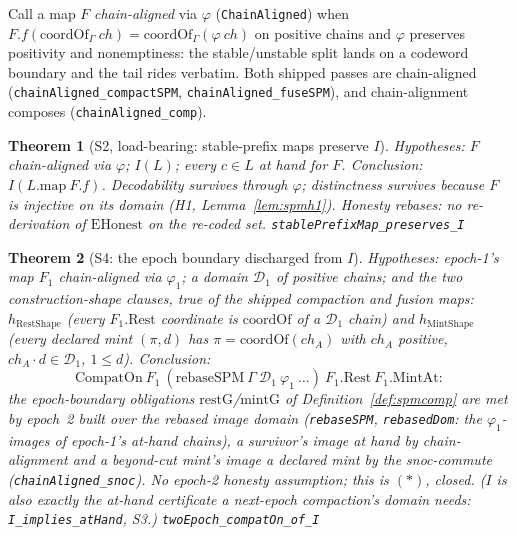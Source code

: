\documentclass[11pt]{article}
\newtheorem{theorem}{Theorem}[section]
\newcommand{\lean}[1]{\texttt{#1}}
\begin{document}
\noindent Call a map $F$ \emph{chain-aligned} via $\varphi$
(\lean{ChainAligned}) when $F.f(\mathrm{coordOf}_\Gamma\ \mathit{ch})
= \mathrm{coordOf}_\Gamma(\varphi\ \mathit{ch})$ on positive chains
and $\varphi$ preserves positivity and nonemptiness: the
stable/unstable split lands on a codeword boundary and the tail rides
verbatim. Both shipped passes are chain-aligned
(\lean{chainAligned\_compactSPM}, \lean{chainAligned\_fuseSPM}), and
chain-alignment composes (\lean{chainAligned\_comp}).

\begin{theorem}[S2, load-bearing: stable-prefix maps preserve $I$]
\label{thm:spmpreservesI}
Hypotheses: $F$ chain-aligned via $\varphi$; $I(L)$; every $c \in L$
at hand for $F$. Conclusion: $I(L.\mathrm{map}\ F.f)$. Decodability
survives through $\varphi$; distinctness survives because $F$ is
injective on its domain (H1, Lemma~\ref{lem:spmh1}). Honesty rebases:
no re-derivation of $\mathrm{EHonest}$ on the re-coded set.
\hfill\lean{stablePrefixMap\_preserves\_I}
\end{theorem}

\begin{theorem}[S4: the epoch boundary discharged from $I$]
\label{thm:starclosed}
Hypotheses: epoch-1's map $F_1$ chain-aligned via $\varphi_1$; a
domain $\mathcal{D}_1$ of positive chains; and the two
construction-shape clauses, true of the shipped compaction and fusion
maps: $h_{\mathrm{RestShape}}$ (every $F_1.\mathrm{Rest}$ coordinate
is $\mathrm{coordOf}$ of a $\mathcal{D}_1$ chain) and
$h_{\mathrm{MintShape}}$ (every declared mint $(\pi, d)$ has $\pi =
\mathrm{coordOf}(\mathit{ch}_A)$ with $\mathit{ch}_A$ positive,
$\mathit{ch}_A \cdot d \in \mathcal{D}_1$, $1 \le d$). Conclusion:
\[
  \mathrm{CompatOn}\ F_1\ (\mathrm{rebaseSPM}\ \Gamma\ \mathcal{D}_1\
  \varphi_1\ \ldots)\ F_1.\mathrm{Rest}\ F_1.\mathrm{MintAt} :
\]
the epoch-boundary obligations $\mathrm{restG}$/$\mathrm{mintG}$ of
Definition~\ref{def:spmcomp} are met by epoch~2 built over the
\emph{rebased image domain} (\lean{rebaseSPM}, \lean{rebasedDom}: the
$\varphi_1$-images of epoch-1's at-hand chains), a survivor's image at
hand by chain-alignment and a beyond-cut mint's image a declared mint
by the snoc-commute (\lean{chainAligned\_snoc}). No epoch-2 honesty
assumption; this is $(\ast)$, closed. ($I$ is also exactly the
at-hand certificate a next-epoch compaction's domain needs:
\lean{I\_implies\_atHand}, S3.)
\hfill\lean{twoEpoch\_compatOn\_of\_I}
\end{theorem}
\end{document}
